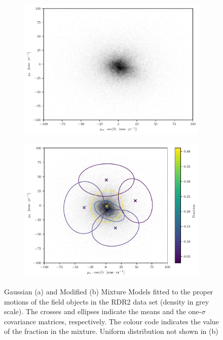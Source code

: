 \begin{figure}[ht!]
    \centering
    \begin{subfigure}[t]{0.45\textwidth}
        \includegraphics[page=3,width=\textwidth]{background/Figures/GMM-PM-BIC=15.pdf}
        \caption{}
        \label{fig:fpmGMM}
    \end{subfigure}
    \begin{subfigure}[t]{0.45\textwidth}
      \includegraphics[page=3,width=\textwidth]{background/Figures/GMM-PM-BIC2-U+7G.pdf}
        \caption{}
        \label{fig:fpmMMM} 
    \end{subfigure}
\caption{Gaussian (a) and Modified (b) Mixture Models fitted to the proper motions of the field objects in the RDR2 data set (density in grey scale). The crosses and ellipses indicate the means and the one-$\sigma$ covariance matrices, respectively. The colour code indicates the value of the fraction in the mixture. Uniform distribution not shown in (b)}
\label{fig:GMMvsMMM}
\end{figure}

